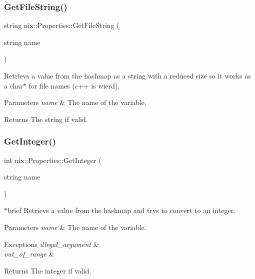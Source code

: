 \subsubsection{\texorpdfstring{Get\+File\+String()}{GetFileString()}}
{\footnotesize\ttfamily string nix\+::\+Properties\+::\+Get\+File\+String (\begin{DoxyParamCaption}\item[{string}]{name }\end{DoxyParamCaption})}



Retrievs a value from the hashmap as a string with a reduced size so it works as a char$\ast$ for file names (c++ is wierd). 


\begin{DoxyParams}{Parameters}
{\em name} & The name of the variable. \\
\hline
\end{DoxyParams}
\begin{DoxyReturn}{Returns}
The string if valid. 
\end{DoxyReturn}
\mbox{\label{classnix_1_1Properties_a97b73ede4ad7170b95a2e034a62567ec}} 
\subsubsection{\texorpdfstring{Get\+Integer()}{GetInteger()}}
{\footnotesize\ttfamily int nix\+::\+Properties\+::\+Get\+Integer (\begin{DoxyParamCaption}\item[{string}]{name }\end{DoxyParamCaption})}

$\ast$brief Retrievs a value from the hashmap and trys to convert to an integer. 
\begin{DoxyParams}{Parameters}
{\em name} & The name of the variable. \\
\hline
\end{DoxyParams}

\begin{DoxyExceptions}{Exceptions}
{\em illegal\+\_\+argument} & \\
\hline
{\em out\+\_\+of\+\_\+range} & \\
\hline
\end{DoxyExceptions}
\begin{DoxyReturn}{Returns}
The integer if valid. 
\end{DoxyReturn}
\mbox{\label{classnix_1_1Properties_a5b56a3806ce0f6a63af87af775a0e633}} 

